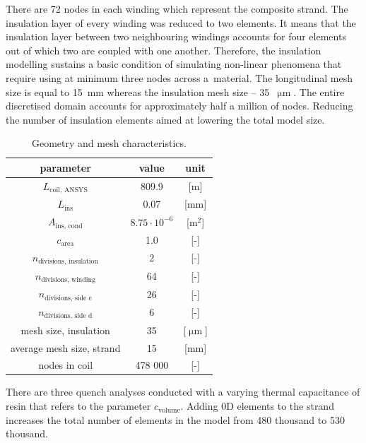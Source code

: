 There are 72 nodes in each winding which represent the composite strand. The insulation layer of every winding was reduced to two elements. It means that the insulation layer between two neighbouring windings accounts for four elements out of which two are coupled with one another. Therefore, the insulation modelling sustains a basic condition of simulating non-linear phenomena that require using at minimum three nodes across a~material. The longitudinal mesh size is equal to 15~mm whereas the insulation mesh size -- 35~$\upmu \text{m}$. The entire discretised domain accounts for approximately half a million of nodes. Reducing the number of insulation elements aimed at lowering the total model size.

\begin{table}[H]
    \caption{Geometry and mesh characteristics.} 
    \vspace{-1.em} 
    \fontsize{10}{10}
    \selectfont 
    \renewcommand{\arraystretch}{1.5}
    \begin{center}
        \begin{tabular}{ ccc }  
        \hline
        parameter & value & unit \\
        \hline
        $L_\text{coil, ANSYS}$ & 809.9 & [m] \\
        $L_\text{ins}$ & 0.07 & [mm] \\
        $A_\text{ins, cond}$ & $8.75 \cdot 10^{-6}$ & [$\text{m}^2$] \\
        $c_\text{area}$ & 1.0 & [-] \\
        $n_\text{divisions, insulation}$ & 2 & [-] \\
        $n_\text{divisions, winding}$ & 64 & [-] \\
        $n_\text{divisions, side e}$ & 26 & [-] \\
        $n_\text{divisions, side d}$ & 6 & [-] \\
        mesh size, insulation & 35 & [$\upmu \text{m}$] \\
        average mesh size, strand & 15 & [mm] \\ 
        nodes in coil & 478 000 & [-] \\
        \hline 
        \end{tabular}
    \end{center}  
     \label{table: skew_quad_geometry_mesh} 
 \end{table}

There are three quench analyses conducted with a varying thermal capacitance of resin that refers to the parameter $c_\text{volume}$. Adding 0D elements to the strand increases the total number of elements in the model from 480 thousand to 530 thousand. 

